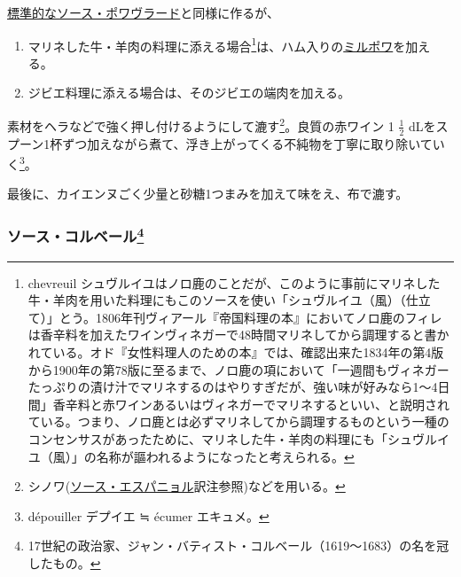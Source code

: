 \begin{recette}

 

\protect\hyperlink{sauce-poivrade}{標準的なソース・ポワヴラード}と同様に作るが、

\begin{enumerate}
\def\labelenumi{\arabic{enumi}.}
\item
  マリネした牛・羊肉の料理に添える場合\footnote{chevreuil
    シュヴルイユはノロ鹿のことだが、このように事前にマリネした牛・羊肉を用いた料理にもこのソースを使い「シュヴルイユ（風）（仕立て）」とう。1806年刊ヴィアール『帝国料理の本』においてノロ鹿のフィレは香辛料を加えたワインヴィネガーで48時間マリネしてから調理すると書かれている。オド『女性料理人のための本』では、確認出来た1834年の第4版から1900年の第78版に至るまで、ノロ鹿の項において「一週間もヴィネガーたっぷりの漬け汁でマリネするのはやりすぎだが、強い味が好みなら1〜4日間」香辛料と赤ワインあるいはヴィネガーでマリネするといい、と説明されている。つまり、ノロ鹿とは必ずマリネしてから調理するものという一種のコンセンサスがあったために、マリネした牛・羊肉の料理にも「シュヴルイユ（風）」の名称が謳われるようになったと考えられる。}は、ハム入りの\protect\hyperlink{mirepoix}{ミルポワ}を加える。
\item
  ジビエ料理に添える場合は、そのジビエの端肉を加える。
\end{enumerate}

素材をヘラなどで強く押し付けるようにして漉す\footnote{シノワ(\protect\hyperlink{sauce-espagnole}{ソース・エスパニョル}訳注参照)などを用いる。}。良質の赤ワイン
1 \(\frac{1}{2}\)
dLをスプーン1杯ずつ加えながら煮て、浮き上がってくる不純物を丁寧に取り除いていく\footnote{dépouiller
  デプイエ ≒ écumer エキュメ。}。

最後に、カイエンヌごく少量と砂糖1つまみを加えて味をえ、布で漉す。

\atoaki{}

\hypertarget{sauce-colbert}{%
\subsubsection[ソース・コルベール]{\texorpdfstring{ソース・コルベール\footnote{17世紀の政治家、ジャン・バティスト・コルベール（1619〜1683）の名を冠したもの。}}{ソース・コルベール}}\label{sauce-colbert}}


\end{recette}
